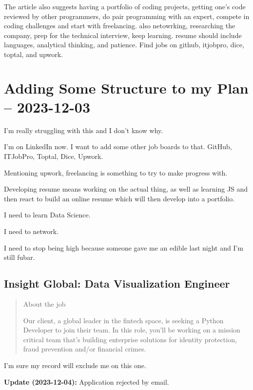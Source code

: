 \documentclass[
	letterpaper, %
	12pt, %
]{CSSullivanBusinessReport}
\begin{document}
The article also suggests having a portfolio of coding projects, getting one's code reviewed by other programmers, do pair programming with an expert, compete in coding challenges and start with freelancing. also netowrking, researching the company, prep for the technical interview, keep learning. resume should include languages, analytical thinking, and patience. Find jobs on github, itjobpro, dice, toptal, and upwork. 


\section[3 Dec: Structuring]{Adding Some Structure to my Plan -- 2023-12-03} %

I'm really struggling with this and I don't know why. 

I'm on LinkedIn now. I want to add some other job boards to that. GitHub, ITJobPro, Toptal, Dice, Upwork.

Mentioning upwork, freelancing is something to try to make progress with.

Developing resume means working on the actual thing, as well as learning JS and then react to build an online resume which will then develop into a portfolio. 

I need to learn Data Science. 

I need to network. 

I need to stop being high because someone gave me an edible last night and I'm still fubar. 

\subsection[Insight Global]{Insight Global: Data Visualization Engineer}

\begin{quote}
	About the job
	
	Our client, a global leader in the fintech space, is seeking a Python Developer to join their team. In this role, you'll be working on a mission critical team that's building enterprise solutions for identity protection, fraud prevention and/or financial crimes.
\end{quote}

I'm sure my record will exclude me on this one. 

\textbf{Update (2023-12-04):} Application rejected by email.
\end{document}
